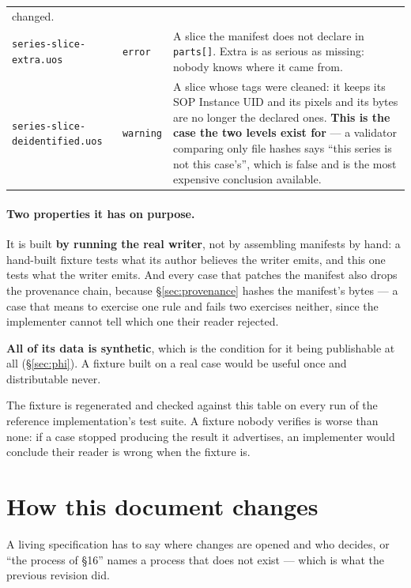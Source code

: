 \documentclass[11pt,a4paper]{article}
\newcommand{\code}[1]{\texttt{\small #1}}
\begin{document}
\begin{longtable}{L{6.3cm} L{2.2cm} L{6.5cm}}
changed.\\
\code{series-slice-extra.uos} & \code{error} & A slice the manifest does not declare in
\code{parts[]}. Extra is as serious as missing: nobody knows where it came from.\\
\code{series-slice-deidentified.uos} & \code{warning} & A slice whose tags were cleaned: it
keeps its SOP Instance UID and its pixels and its bytes are no longer the declared ones.
\textbf{This is the case the two levels exist for} --- a validator comparing only file
hashes says ``this series is not this case's'', which is false and is the most expensive
conclusion available.\\
\bottomrule
\end{longtable}

\paragraph{Two properties it has on purpose.}
It is built \textbf{by running the real writer}, not by assembling manifests by hand: a
hand-built fixture tests what its author believes the writer emits, and this one tests what
the writer emits. And every case that patches the manifest also drops the provenance chain,
because \S\ref{sec:provenance} hashes the manifest's bytes --- a case that means to
exercise one rule and fails two exercises neither, since the implementer cannot tell which
one their reader rejected.

\textbf{All of its data is synthetic}, which is the condition for it being publishable at
all (\S\ref{sec:phi}). A fixture built on a real case would be useful once and
distributable never.

The fixture is regenerated and checked against this table on every run of the reference
implementation's test suite. A fixture nobody verifies is worse than none: if a case
stopped producing the result it advertises, an implementer would conclude their reader is
wrong when the fixture is.

\section{How this document changes}\label{sec:process}

A living specification has to say where changes are opened and who decides, or ``the
process of \S16'' names a process that does not exist --- which is what the previous
revision did.
\end{document}
